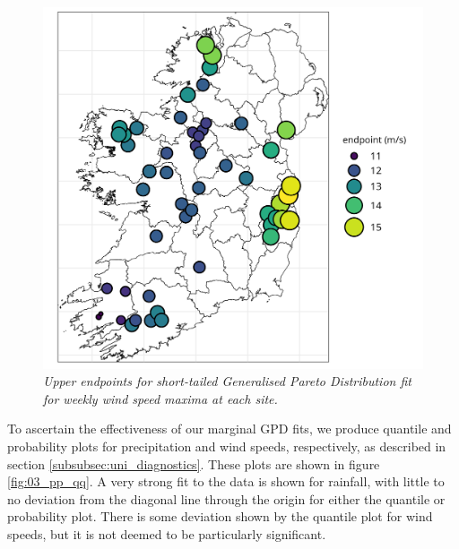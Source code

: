 \documentclass{article}
\numberwithin{equation}{section}
\begin{document}
\begin{figure}[H]
    \centering
    \includegraphics[width = 0.9\linewidth]{plots/034_ws_endpoint.png}
    \caption{\emph{Upper endpoints for short-tailed Generalised Pareto Distribution fit for weekly wind speed maxima at each site.}}
    \label{fig:03_ws_endpoint}
\end{figure}


To ascertain the effectiveness of our marginal GPD fits, we produce quantile and probability plots for precipitation and wind speeds, respectively, as described in section \ref{subsubsec:uni_diagnostics}.
These plots are shown in figure \ref{fig:03_pp_qq}.
A very strong fit to the data is shown for rainfall, with little to no deviation from the diagonal line through the origin for either the quantile or probability plot.
There is some deviation shown by the quantile plot for wind speeds, but it is not deemed to be particularly significant.
\end{document}
